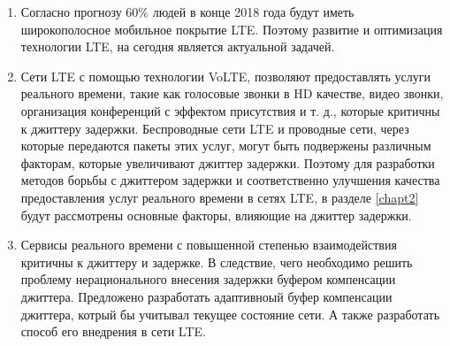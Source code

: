 \begin{enumerate}
\item Согласно прогнозу \cite{ericsson} 60\% людей в конце 2018 года будут иметь широкополосное мобильное покрытие LTE. Поэтому развитие и оптимизация технологии LTE, на сегодня является актуальной задачей.

\item Сети LTE с помощью технологии VoLTE, позволяют предоставлять услуги реального времени, такие как голосовые звонки в HD качестве, видео звонки, организация конференций с эффектом присутствия и т. д., которые критичны к джиттеру задержки. Беспроводные сети LTE и проводные сети, через которые передаются пакеты этих услуг, могут быть подвержены различным факторам, которые увеличивают джиттер задержки. Поэтому для разработки методов борьбы с джиттером задержки и соответственно улучшения качества предоставления услуг реального времени в сетях LTE, в разделе \ref{chapt2} будут рассмотрены основные факторы, влияющие на джиттер задержки.

\item Сервисы реального времени с повышенной степенью взаимодействия критичны к джиттеру и задержке. В следствие, чего необходимо решить проблему нерационального внесения задержки буфером компенсации джиттера. 
Предложено разработать адаптивноый буфер компенсации джиттера, котрый бы учитывал текущее состояние сети. 
А также разработать способ его внедрения  в сети LTE.

\end{enumerate}

\clearpage




